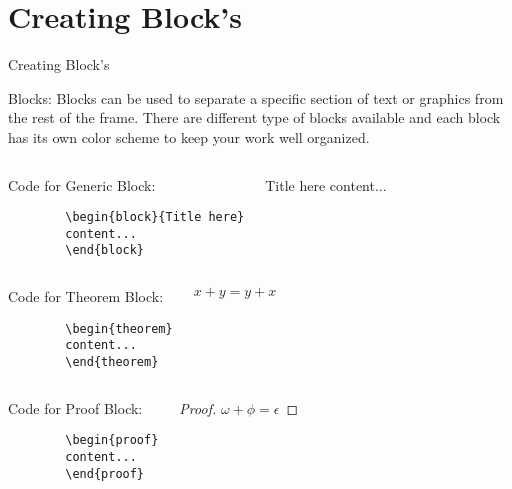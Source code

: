 \documentclass[10pt,xcolor=x11names]{beamer}
\begin{document}
\section{Creating Block's}
\begin{frame}{Creating Block's} 
\begin{block}{Blocks:}
	Blocks can be used to separate a specific section of text or graphics
	from the rest of the frame. There are different type of blocks available and each block has its own color scheme to keep your
	work well organized.
\end{block}

{\footnotesize
\begin{columns}[t]
	\begin{block}{Code for Generic Block:}
		\begin{verbatim}
		\begin{block}{Title here}
		content...
		\end{block}
		\end{verbatim}	
	\end{block}
	\begin{block}{Title here}
		content...
	\end{block}
\end{columns}

\begin{columns}[t]
	\begin{block}{Code for Theorem Block:}
		\begin{verbatim}
		\begin{theorem}
		content...
		\end{theorem}
		\end{verbatim}	
	\end{block}
		\begin{theorem}
			$ x + y = y + x  $
		\end{theorem}
\end{columns}}

\vspace{10pt}
{\scriptsize 
\begin{columns}[t]
	\begin{block}{Code for Proof Block:}
		\begin{verbatim}
		\begin{proof}
		content...
		\end{proof}
		\end{verbatim}	
	\end{block}
\begin{proof}
	$\omega +\phi = \epsilon $
\end{proof}
\end{columns}

}
\end{frame}
\end{document}

